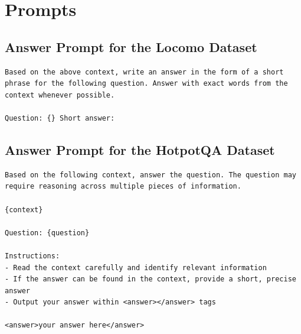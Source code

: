\section{Prompts}
\label{appendix:prompts}





\subsection{Answer Prompt for the Locomo Dataset}

\begin{center}
\begin{tcolorbox}[title={Answer Prompt for the Locomo Dataset}]
\begin{Verbatim}[breaklines, breakanywhere, fontsize=\small,
                 fontfamily=tt, fontseries=b]
Based on the above context, write an answer in the form of a short phrase for the following question. Answer with exact words from the context whenever possible.

Question: {} Short answer:
\end{Verbatim}
\end{tcolorbox}

\end{center}

\subsection{Answer Prompt for the HotpotQA Dataset}
\begin{center}
\begin{tcolorbox}[title={Answer Prompt for the HotpotQA Dataset}]
{
\begin{Verbatim}[breaklines, breakanywhere, fontsize=\small,
                 fontfamily=tt, fontseries=b]
Based on the following context, answer the question. The question may require reasoning across multiple pieces of information.

{context}

Question: {question}

Instructions:
- Read the context carefully and identify relevant information
- If the answer can be found in the context, provide a short, precise answer
- Output your answer within <answer></answer> tags

<answer>your answer here</answer>
\end{Verbatim}
}
\label{appendix:case_1}
\end{tcolorbox}
\end{center}




